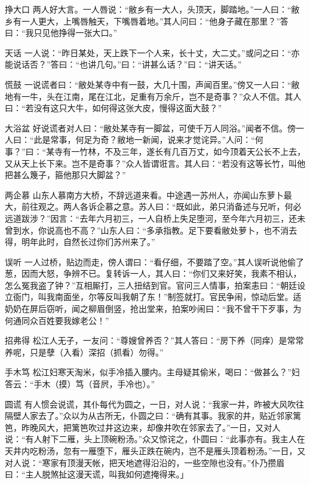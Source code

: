 \documentclass[12pt,UTF8]{ctexbook}
\begin{document}
挣大口
两人好大言。一人唇说：“敝乡有一大人，头顶天，脚踏地。”一人曰：“敝乡有一人更大，上嘴唇触天，下嘴唇着地。”其人问曰：“他身子藏在那里？”答曰：“我只见他挣得一张大口。”

天话
一人说：“昨日某处，天上跌下一个人来，长十丈，大二丈。”或问之曰：“亦能说话否？”答曰：“也讲几句。”曰：“讲甚么话？”曰：“讲天话。”

慌鼓
一说谎者曰：“敝处某寺中有一鼓，大几十围，声闻百里。”傍又一人曰：“敝地有一牛，头在江南，尾在江北，足重有万余斤，岂不是奇事？”众人不信。其人曰：“若没有这只大牛，如何得这张大皮，慢得这面大鼓？”

大浴盆
好说谎者对人曰：“敝处某寺有一脚盆，可使千万人同浴。”闻者不信。傍一人曰：“此是常事，何足为奇？敝地一新闻，说来才觉诧异。”人问：“何事？”曰：“某寺有一竹林，不及三年，遂长有几百万丈，如今顶着天公长不上去，又从天上长下来。岂不是奇事？”众人皆谓诳言。其人曰：“若没有这等长竹，叫他把甚么篾子，箍他那只大脚盆？”

两企慕
山东人慕南方大桥，不辞远道来看。中途遇一苏州人，亦闻山东萝卜最大，前往观之。两人各诉企慕之意。苏人曰：“既如此，弟只消备述与兄听，何必远道跋涉？”因言：“去年六月初三，一人自桥上失足堕河，至今年六月初三，还未曾到水，你说高也不高？”山东人曰：“多承指教。足下要看敝处萝卜，也不消去得，明年此时，自然长过你们苏州来了。”

误听
一人过桥，贴边而走，傍人谓曰：“看仔细，不要踏了空。”其人误听说他偷了葱，因而大怒，争辨不已。复转诉一人，其人曰：“你们又来好笑，我素不相认，怎么冤我盗了钟？”互相厮打，三人扭结到官。官问三人情事，拍案恚曰：“朝廷设立衙门，叫我南面坐，尔等反叫我朝了东！”制签就打。官民争闹，惊动后堂。适奶奶在屏后窃听，闻之柳眉倒竖，抢出堂来，拍案吵闹曰：“我不曾干下歹事，为何通同众百姓要我嫁老公！”

招弗得
松江人无子，一友问：“尊嫂曾养否？”其人答曰：“房下养（同痒）是常常养呢，只是孽（入看）深招（抓看）勿得。”

手木笃
松江妇寒天淘米，似手冷插入腰内。主母疑其偷米，喝曰：“做甚么？”妇答云：“手木（摸）笃（音屄，手冷也）。”

圆谎
有人惯会说谎，其仆每代为圆之，一日，对人说：“我家一井，昨被大风吹往隔壁人家去了。”众以为从古所无，仆圆之曰：“确有其事。我家的井，贴近邻家篱笆，昨晚风大，把篱笆吹过井这边来，却像井吹在邻家去了。”一日，又对人说：“有人射下二雁，头上顶碗粉汤。”众又惊诧之，仆圆曰：“此事亦有。我主人在天井内吃粉汤，忽有一雁堕下，雁头正跌在碗内，岂不是雁头顶着粉汤。”一日，又对人说：“寒家有顶漫天帐，把天地遮得沿沿的，一些空隙也没有。”仆乃攒眉曰：“主人脱煞扯这漫天谎，叫我如何遮掩得来。」
\end{document}
